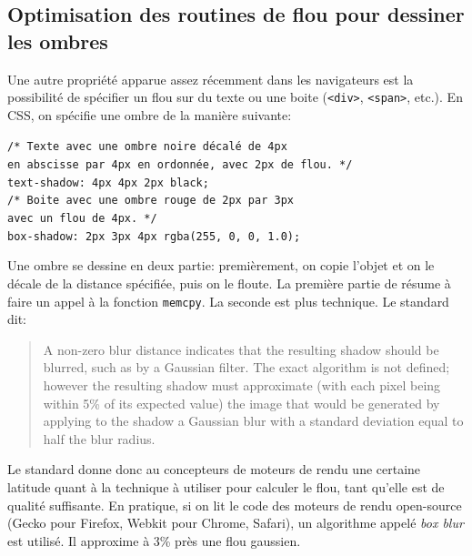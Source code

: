 \documentclass[a4paper,10pt]{article}
\newcommand{\cc}[1]{\texttt{#1}}
\begin{document}
\begin{multicols}{2}
  \section{Optimisation des routines de flou pour dessiner les ombres}

  Une autre propriété apparue assez récemment dans les navigateurs est la
  possibilité de spécifier un flou sur du texte ou une boite (\cc{<div>},
  \cc{<span>}, etc.). En CSS, on spécifie une ombre de la manière suivante:

    \noindent
  {\footnotesize
  \cc{/* Texte avec une ombre noire décalé de 4px\\
    en abscisse par 4px en ordonnée, avec 2px de flou. */\\
    text-shadow: 4px 4px 2px black;\\
    /* Boite avec une ombre rouge de 2px par 3px\\
    avec un flou de 4px. */\\
    box-shadow: 2px 3px 4px rgba(255, 0, 0, 1.0);
  }}

  Une ombre se dessine en deux partie: premièrement, on copie l'objet et on le
  décale de la distance spécifiée, puis on le floute. La première partie de
  résume à faire un appel à la fonction \cc{memcpy}. La seconde est plus
  technique. Le standard dit:

  \begin{quote}
    A non-zero blur distance indicates that the resulting shadow should be
    blurred, such as by a Gaussian filter. The exact algorithm is not defined;
    however the resulting shadow must approximate (with each pixel being within
    5\% of its expected value) the image that would be generated by applying to
    the shadow a Gaussian blur with a standard deviation equal to half the blur
    radius.
  \end{quote}

  Le standard donne donc au concepteurs de moteurs de rendu une certaine
  latitude quant à la technique à utiliser pour calculer le flou, tant qu'elle
  est de qualité suffisante. En pratique, si on lit le code des moteurs de rendu
  open-source (Gecko pour Firefox, Webkit pour Chrome, Safari), un algorithme
  appelé \emph{box blur} est utilisé.  Il approxime à 3\% près une flou
  gaussien.


\end{multicols}
\end{document}
